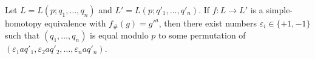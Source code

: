 Let $L = L(p; q_1, \dots, q_n)$ and $L' = L(p; q'_1, \dots, q'_n)$. If $f: L \to L'$ is a simple-homotopy equivalence with $f_\#(g) = g'^a$, then there exist numbers $\varepsilon_i \in \{+1, -1\}$ such that $(q_1, \dots, q_n)$ is equal modulo $p$ to some permutation of $(\varepsilon_1 a q'_1, \varepsilon_2 a q'_2, \dots, \varepsilon_n a q'_n)$.
